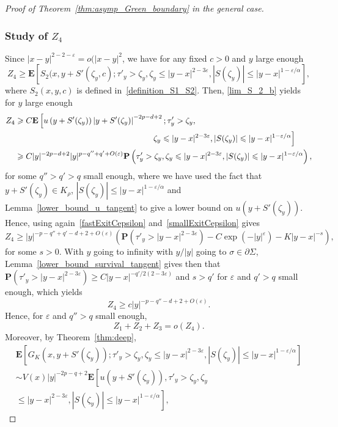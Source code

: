 \documentclass[AHL,Unicode,longabstracts,published]{cedram}
\newcommand{\pr}{\mathbf{P}}
\newcommand{\e}{\mathbf{E}}
\renewcommand{\epsilon}{\varepsilon}
\renewcommand{\leq}{\leqslant}
\renewcommand{\geq}{\geqslant}
\begin{document}
\begin{proof}[Proof of Theorem~\ref{thm:asymp_Green_boundary} in the general case]
\subsubsection*{Study of \texorpdfstring{$Z_4$}{Z4}}
Since $| x-y|^{2-2-\epsilon}=o(| x-y|^2$, we have for any fixed $c>0$ and $y$ large enough
\[
Z_{4}\geq\e\left[S_2(x,y+S'\left(\zeta_{y},c\right);\tau'_{y}>\zeta_{y},\zeta_{y}\leq |y-x|^{2-3\epsilon},|S(\zeta_{y})| \leq | y-x|^{1-\epsilon/\alpha}\right],
\]
where $S_2(x,y,c)$ is defined in~\eqref{definition_S1_S2}. Then, \eqref{lim_S_2_b} yields for $y$ large enough
\begin{align*}
Z_{4}
&\geq C\e\left[u\left(y+S'(\zeta_{y})\right)\left|y+S'(\zeta_{y})\right|^{-2p-d+2};\tau'_{y}>\zeta_{y},\right.\\
&\mkern306mu\zeta_{y}\left.\leq |y-x|^{2-3\epsilon},\left|S(\zeta_{y})\right| \leq |y-x|^{1-\epsilon/\alpha}\right]\\
&\geq C|y|^{-2p-d+2}|y|^{p-q''+q'+O(\epsilon)}\pr\left(\tau'_{y}>\zeta_{y},\zeta_{y}\leq |y-x|^{2-3\epsilon},| S(\zeta_{y})| \leq |y-x|^{1-\epsilon/\alpha}\right),
\end{align*}
for some $q''>q'>q$ small enough, where we have used the fact that $y+S'(\zeta_{y})\in{K}_{\rho}$, $| S(\zeta_{y})| \leq | y-x|^{1-\epsilon/\alpha}$ and Lemma~\ref{lower_bound_u_tangent} to give a lower bound on $u(y+S'(\zeta_{y}))$. Hence, using again~\eqref{fastExitCepsilon} and~\eqref{smallExitCepsilon} gives
\[
Z_{4}\geq |y|^{-p-q''+q'-d+2+O(\epsilon)}\left(\pr\left(\tau'_{y}>|y-x|^{2-3\epsilon}\right)-C\exp\left(-| y|^{\epsilon}\right)-K |y-x|^{-s}\right),
\]
for some $s>0$. With $y$ going to infinity with $y/| y|$ going to $\sigma\in\partial \Sigma$, Lemma~\ref{lower_bound_survival_tangent} gives then that $\pr(\tau'_{y}>| y-x|^{2-3\epsilon}) \geq C | y-x|^{-q'/2(2-3\epsilon)}$ and $s>q'$ for $\epsilon$ and $q'>q$ small enough, which yields
\[
Z_{4}\geq c| y|^{-p-q''-d+2+O(\epsilon)}.
\]
Hence, for $\epsilon$ and $q''>q$ small enough,
\[
Z_{1}+Z_{2}+Z_{3}=o(Z_{4}).
\]
Moreover, by Theorem~\ref{thm:deep},
\begin{multline*}
\e\left[G_{K}\left(x,y+S'(\zeta_{y})\right);\tau'_{y}>\zeta_{y},\zeta_{y}\leq |y-x|^{2-3\epsilon},| S(\zeta_{y})| \leq |y-x|^{1-\epsilon/\alpha}\right]\\
\sim V(x)|y|^{-2p-q+2}\e\left[u\left(y+S'(\zeta_{y})\right),\tau'_{y}>\zeta_{y},\zeta_{y}\right.\\
\left.\leq |y-x|^{2-3\epsilon},|S(\zeta_{y})|\leq | y-x|^{1-\epsilon/\alpha}\right],
\end{multline*}

\end{proof}
\end{document}
